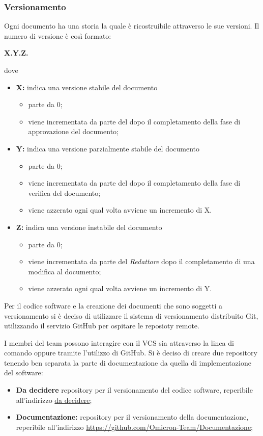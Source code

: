 \subsubsection{Versionamento}
Ogni documento ha una storia la quale è ricostruibile attraverso le sue versioni. Il numero di versione è così formato:
\begin{center}
\textbf{X.Y.Z.}
\end{center}
dove
\begin{itemize}
 \item \textbf{X:} indica una versione stabile del documento
 	\begin{itemize}
 		\item parte da 0;
 		\item viene incrementata da parte del \respProg{} dopo il completamento della fase di approvazione del documento;
 	\end{itemize}
 \item \textbf{Y:}  indica una versione parzialmente stabile del documento
 	\begin{itemize}
 		\item parte da 0;
 		\item viene incrementata da parte del \verifProg{} dopo il completamento della fase di verifica del documento;
 		\item viene azzerato ogni qual volta avviene un incremento di X.
 	\end{itemize}
 \item \textbf{Z:} indica una versione instabile del documento
 \begin{itemize}
 		\item parte da 0;
 		\item viene incrementata da parte del \emph{Redattore} dopo il completamento di una modifica al documento;
 		\item viene azzerato ogni qual volta avviene un incremento di Y.
 	\end{itemize}
\end{itemize}

Per il codice software e la creazione dei documenti che sono soggetti a versionamento si è deciso di utilizzare il sistema di versionamento distribuito Git, utilizzando il servizio GitHub per ospitare le reposioty remote.


I membri del team \Omicron{} possono interagire con il VCS sia attraverso la linea di comando oppure tramite l'utilizzo di GitHub. Si è deciso di creare due repository tenendo ben separata la parte di documentazione da quella di implementazione del software:
\begin{itemize}
 \item \textbf{Da decidere} repository per il versionamento del codice software, reperibile all'indirizzo \url{da decidere};
 \item \textbf{Documentazione:} repository per il versionamento della documentazione, reperibile all'indirizzo \url{https://github.com/Omicron-Team/Documentazione};
\end{itemize}

